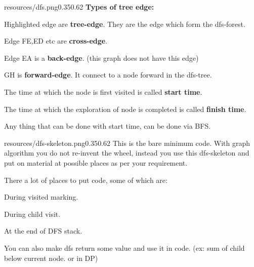 \begin{lfigure}{resources/dfs.png}{0.35}{0.62}
    \textbf{Types of tree edge:}
   \begin{compactenum}
        \item Highlighted edge are \textbf{tree-edge}. They are the edge which form the dfs-forest.
        \item Edge FE,ED etc are \textbf{cross-edge}.
        \item Edge EA is a \textbf{back-edge}. (this graph does not have this edge)
        \item GH is \textbf{forward-edge}. It connect to a node forward in the dfs-tree.
   \end{compactenum}

   The time at which the node is first visited is called \textbf{start time}.

   The time at which the exploration of node is completed is called \textbf{finish time}.

   Any thing that can be done with start time, can be done via BFS.
\end{lfigure}


\begin{lfigure}{resources/dfs-skeleton.png}{0.35}{0.62}
   This is the bare minimum code. With graph algorithm you do not re-invent the wheel, instead you use this dfs-skeleton and put on material at possible places as per your requirement.
   
   There a lot of places to put code, some of which are:
   \begin{compactenum}
        \item During visited marking.
        \item During child visit.
        \item At the end of DFS stack.
        \item You can also make dfs return some value and use it in code. (ex: sum of child below current node. or in DP)
   \end{compactenum}
\end{lfigure}

\begin{fullwidth}
    

\end{fullwidth}


